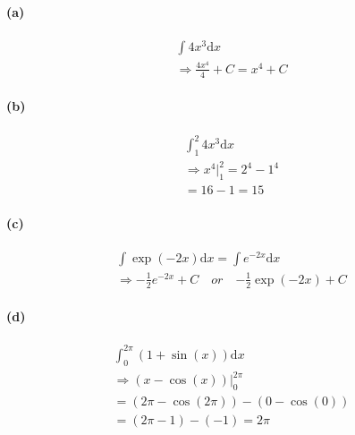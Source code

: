     \footnotesize{
    \begin{multicols}{2}
        \paragraph{(a)}
        \begin{equation*}
            \begin{gathered}
                \int 4x^3 \mathrm{d}x
                \\
                \Rightarrow \frac{4x^4}{4} + C = \boxed{x^4 + C}
            \end{gathered}
        \end{equation*}
        \horizontal

        \paragraph{(b)}
        \begin{equation*}
            \begin{gathered}
                \int_{1}^{2} 4x^3 \mathrm{d}x
                \\
                \Rightarrow x^4 \Big|_{1}^{2} = 2^4 - 1^4 
                \\
                = 16 - 1 = \boxed{15} 
            \end{gathered}
        \end{equation*}
        \horizontal

        \paragraph{(c)}
        \begin{equation*}
            \begin{gathered}
                \int \exp(-2x) \mathrm{d}x = \int e^{-2x} \mathrm{d}x
                \\
                \Rightarrow \boxed {-\frac{1}{2}e^{-2x} + C} \quad or \quad \boxed{-\frac{1}{2}\exp(-2x) + C}
            \end{gathered}
        \end{equation*}
        \horizontal

        \paragraph{(d)}
        \begin{equation*}
            \begin{gathered}
                \int_{0}^{2\pi}(1 + \sin(x))\mathrm{d}x
                \\
                \Rightarrow (x - \cos(x))\big|_{0}^{2\pi}
                \\
                = (2\pi - \cos(2\pi)) - (0 - \cos(0)) 
                \\
                = (2\pi - 1) - (-1) = \boxed{2\pi}
            \end{gathered}
        \end{equation*}


\end{multicols}}
